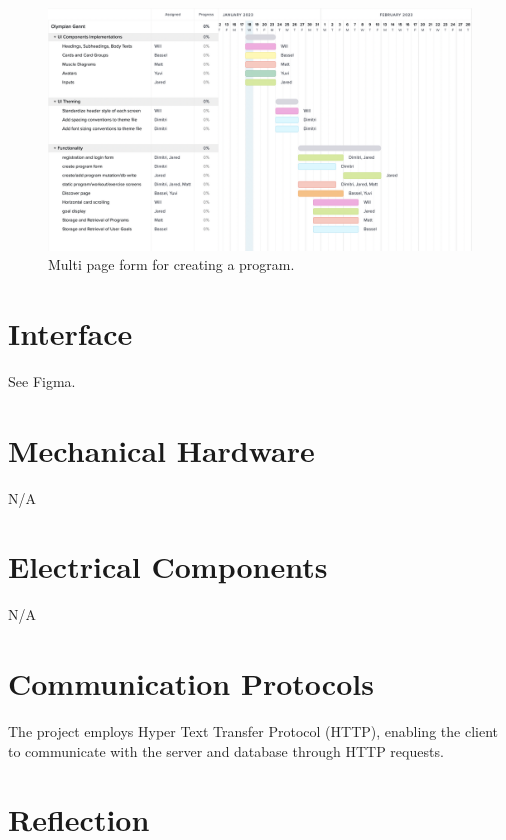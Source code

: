 \documentclass[12pt, titlepage]{article}
\begin{document}
  \begin{figure}[H]
		\centering
		\includegraphics[width=\linewidth,keepaspectratio]{gantt_chart}
    \caption{Multi page form for creating a program.}
	\end{figure}
	
	
	
	\newpage{}
	
	\appendix
	
	\section{Interface}
	
	See Figma.
	
	\section{Mechanical Hardware}
	N/A
	
	\section{Electrical Components}
	N/A
	
	\section{Communication Protocols}
	The project employs Hyper Text Transfer Protocol (HTTP), enabling the client to communicate with the server and database through HTTP requests.
	
	\section{Reflection}
	
\end{document}

